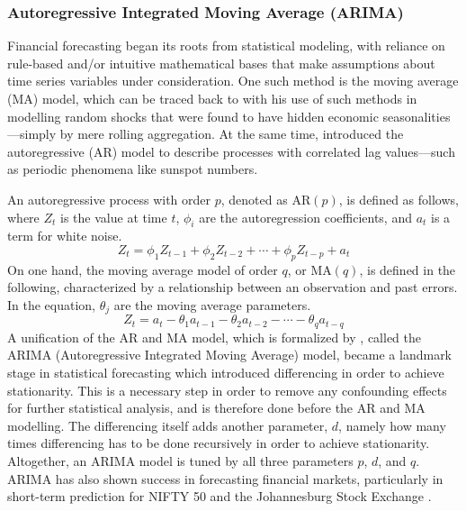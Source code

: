 \documentclass[stu,floatsintext]{apa7}
\begin{document}
\subsubsection{Autoregressive Integrated Moving Average (ARIMA)}

Financial forecasting began its roots from statistical modeling, with reliance on rule-based and/or intuitive mathematical bases that make assumptions about time series variables under consideration. One such method is the moving average (MA) model, which can be traced back to \textcite{slutzky1937summation} with his use of such methods in modelling random shocks that were found to have hidden economic seasonalities—simply by mere rolling aggregation. At the same time, \textcite{yule1927method} introduced the autoregressive (AR) model to describe processes with correlated lag values—such as periodic phenomena like sunspot numbers.

An autoregressive process with order $p$, denoted as $\text{AR}(p)$, is defined as follows, where $Z_t$ is the value at time $t$, $\phi_i$ are the autoregression coefficients, and $a_t$ is a term for white noise.
\begin{equation}Z_t=\phi_1 Z_{t-1}+\phi_2 Z_{t-2} + \cdots + \phi_p Z_{t-p} + a_t\end{equation}
On one hand, the moving average model of order $q$, or $\text{MA}(q)$, is defined in the following, characterized by a relationship between an observation and past errors. In the equation, $\theta_j$ are the moving average parameters.
\begin{equation}Z_t=a_t-\theta_1a_{t-1}-\theta_2a_{t-2}-\cdots-\theta_qa_{t-q}\end{equation}
A unification of the AR and MA model, which is formalized by \textcite{box1970time}, called the ARIMA (Autoregressive Integrated Moving Average) model, became a landmark stage in statistical forecasting which introduced differencing in order to achieve stationarity. This is a necessary step in order to remove any confounding effects for further statistical analysis, and is therefore done before the AR and MA modelling. The differencing itself adds another parameter, $d$, namely how many times differencing has to be done recursively in order to achieve stationarity. Altogether, an ARIMA model is tuned by all three parameters $p$, $d$, and $q$. ARIMA has also shown success in forecasting financial markets, particularly in short-term prediction for NIFTY 50 and the Johannesburg Stock Exchange \parencite{funde2023comparison}.
\end{document}
